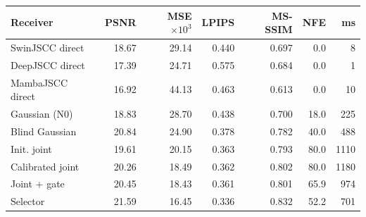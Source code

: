 \scriptsize\setlength{\tabcolsep}{2.4pt}
\begin{tabular}{lrrrrrr}
\toprule
Receiver & PSNR & MSE$\times10^3$ & LPIPS & MS-SSIM & NFE & ms\\
\midrule
SwinJSCC direct & 18.67 & 29.14 & 0.440 & 0.697 & 0.0 & 8\\
DeepJSCC direct & 17.39 & 24.71 & 0.575 & 0.684 & 0.0 & 1\\
MambaJSCC direct & 16.92 & 44.13 & 0.463 & 0.613 & 0.0 & 10\\
Gaussian (N0) & 18.83 & 28.70 & 0.438 & 0.700 & 18.0 & 225\\
Blind Gaussian & 20.84 & 24.90 & 0.378 & 0.782 & 40.0 & 488\\
Init. joint & 19.61 & 20.15 & 0.363 & 0.793 & 80.0 & 1110\\
Calibrated joint & 20.26 & 18.49 & 0.362 & 0.802 & 80.0 & 1180\\
Joint + gate & 20.45 & 18.43 & 0.361 & 0.801 & 65.9 & 974\\
Selector & 21.59 & 16.45 & 0.336 & 0.832 & 52.2 & 701\\
\bottomrule
\end{tabular}
